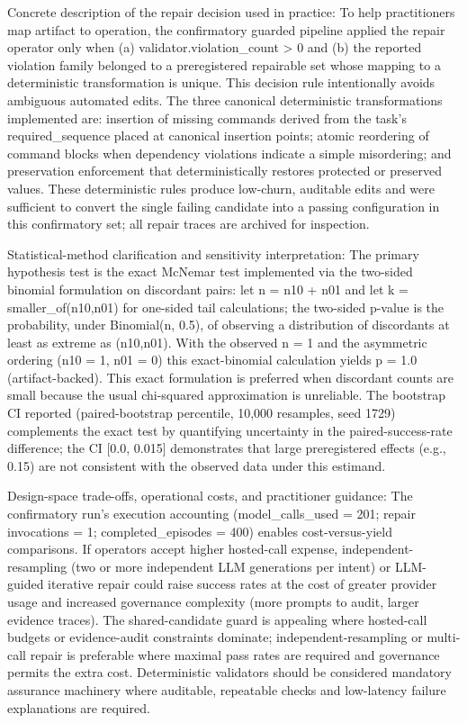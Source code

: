 \documentclass[conference]{IEEEtran}
\begin{document}
Concrete description of the repair decision used in practice: To help practitioners map artifact to operation, the confirmatory guarded pipeline applied the repair operator only when (a) validator.violation\_count > 0 and (b) the reported violation family belonged to a preregistered repairable set whose mapping to a deterministic transformation is unique. This decision rule intentionally avoids ambiguous automated edits. The three canonical deterministic transformations implemented are: insertion of missing commands derived from the task's required\_sequence placed at canonical insertion points; atomic reordering of command blocks when dependency violations indicate a simple misordering; and preservation enforcement that deterministically restores protected or preserved values. These deterministic rules produce low-churn, auditable edits and were sufficient to convert the single failing candidate into a passing configuration in this confirmatory set; all repair traces are archived for inspection.

Statistical-method clarification and sensitivity interpretation: The primary hypothesis test is the exact McNemar test implemented via the two-sided binomial formulation on discordant pairs: let n = n10 + n01 and let k = smaller\_of(n10,n01) for one-sided tail calculations; the two-sided p-value is the probability, under Binomial(n, 0.5), of observing a distribution of discordants at least as extreme as (n10,n01). With the observed n = 1 and the asymmetric ordering (n10 = 1, n01 = 0) this exact-binomial calculation yields p = 1.0 (artifact-backed). This exact formulation is preferred when discordant counts are small because the usual chi-squared approximation is unreliable. The bootstrap CI reported (paired-bootstrap percentile, 10,000 resamples, seed 1729) complements the exact test by quantifying uncertainty in the paired-success-rate difference; the CI [0.0, 0.015] demonstrates that large preregistered effects (e.g., 0.15) are not consistent with the observed data under this estimand.

Design-space trade-offs, operational costs, and practitioner guidance: The confirmatory run's execution accounting (model\_calls\_used = 201; repair invocations = 1; completed\_episodes = 400) enables cost-versus-yield comparisons. If operators accept higher hosted-call expense, independent-resampling (two or more independent LLM generations per intent) or LLM-guided iterative repair could raise success rates at the cost of greater provider usage and increased governance complexity (more prompts to audit, larger evidence traces). The shared-candidate guard is appealing where hosted-call budgets or evidence-audit constraints dominate; independent-resampling or multi-call repair is preferable where maximal pass rates are required and governance permits the extra cost. Deterministic validators should be considered mandatory assurance machinery where auditable, repeatable checks and low-latency failure explanations are required.
\end{document}
